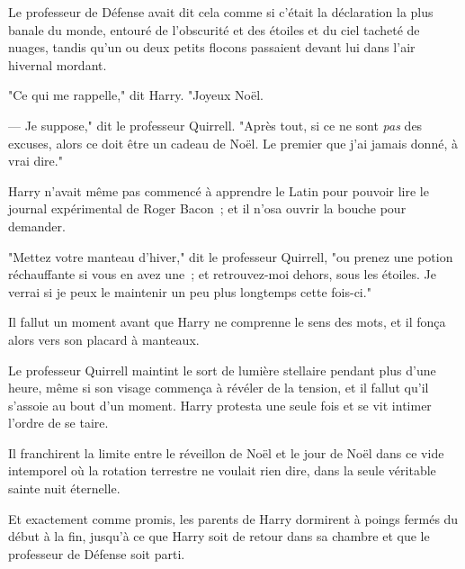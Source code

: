 Le professeur de Défense avait dit cela comme si c'était la déclaration la plus banale du monde, entouré de l'obscurité et des étoiles et du ciel tacheté de nuages, tandis qu'un ou deux petits flocons passaient devant lui dans l'air hivernal mordant.

"Ce qui me rappelle," dit Harry. "Joyeux Noël.

--- Je suppose," dit le professeur Quirrell. "Après tout, si ce ne sont \emph{pas} des excuses, alors ce doit être un cadeau de Noël. Le premier que j'ai jamais donné, à vrai dire."

Harry n'avait même pas commencé à apprendre le Latin pour pouvoir lire le journal expérimental de Roger Bacon~; et il n'osa ouvrir la bouche pour demander.

"Mettez votre manteau d'hiver," dit le professeur Quirrell, "ou prenez une potion réchauffante si vous en avez une~; et retrouvez-moi dehors, sous les étoiles. Je verrai si je peux le maintenir un peu plus longtemps cette fois-ci."

Il fallut un moment avant que Harry ne comprenne le sens des mots, et il fonça alors vers son placard à manteaux.

Le professeur Quirrell maintint le sort de lumière stellaire pendant plus d'une heure, même si son visage commença à révéler de la tension, et il fallut qu'il s'assoie au bout d'un moment. Harry protesta une seule fois et se vit intimer l'ordre de se taire.

Il franchirent la limite entre le réveillon de Noël et le jour de Noël dans ce vide intemporel où la rotation terrestre ne voulait rien dire, dans la seule véritable sainte nuit éternelle.

Et exactement comme promis, les parents de Harry dormirent à poings fermés du début à la fin, jusqu'à ce que Harry soit de retour dans sa chambre et que le professeur de Défense soit parti.

